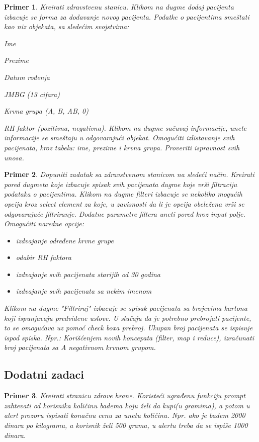 \documentclass[a4paper]{article}
\newtheorem{primer}{Primer}[section]
\begin{document}
\begin{primer}
Kreirati zdravstvenu stanicu. Klikom na dugme dodaj pacijenta izbacuje se forma za dodavanje novog pacijenta. Podatke o pacijentima smeštati kao niz objekata, sa sledećim svojstvima:
\item Ime
\item Prezime
\item Datum rođenja
\item JMBG (13 cifara)
\item Krvna grupa (A, B, AB, 0)
\item RH faktor (pozitivna, negativna).
Klikom na dugme sačuvaj informacije, unete informacije se smeštaju u odgovarajući 
objekat. Omogućiti izlistavanje svih pacijenata, kroz tabelu: ime, prezime i krvna grupa.
Proveriti ispravnost svih unosa.
\end{primer}

\begin{primer}
Dopuniti zadatak sa zdravstvenom stanicom na sledeći način. 
Kreirati pored dugmeta koje izbacuje spisak svih pacijenata dugme koje vrši filtraciju podataka o pacijentima.
Klikom na dugme filteri izbacuje se nekoliko mogućih opcija kroz select element za koje, u zavisnosti da li je opcija obeležena vrši se odgovarajuće filtriranje.
Dodatne parametre filtera uneti pored kroz input polje.
Omogućiti naredne opcije:
\begin{itemize}
\item izdvajanje određene krvne grupe
\item odabir RH faktora
\item izdvajanje svih pacijenata starijih od 30 godina
\item izdvajanje svih pacijenata sa nekim imenom 
\end{itemize}
Klikom na dugme "Filtriraj" izbacuje se spisak pacijenata sa brojevima kartona koji ispunjavaju predviđene uslove. 
U slučaju da je potrebno prebrojati pacijente, to se omogućava uz pomoć check boxa prebroj. Ukupan broj pacijenata se ispisuje ispod spiska.
Npr.: Korišćenjem novih koncepata (filter, map i reduce), izračunati broj pacijenata sa A negativnom krvnom grupom.
\end{primer}

\subsection{Dodatni zadaci}
\begin{primer}
Kreirati stranicu zdrave hrane. Koristeći ugrađenu funkciju prompt zahtevati od korisnika količinu badema koju želi da kupi(u gramima), a potom u alert prozoru ispisati konačnu cenu za unetu količinu. Npr. ako je badem 2000 dinara po kilogramu, a korisnik želi 500 grama, u alertu treba da se ispiše 1000 dinara.  
\end{primer}
\end{document}

